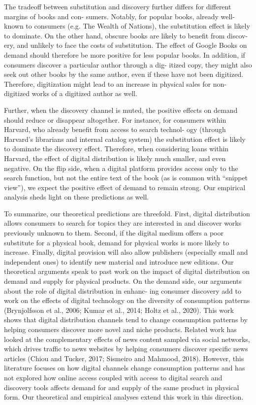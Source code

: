 \documentclass{article}
\begin{document}
The tradeoff between substitution and discovery further differs for different margins of books and con- sumers. Notably, for popular books, already well-known to consumers (e.g. The Wealth of Nations), the substitution effect is likely to dominate. On the other hand, obscure books are likely to benefit from discov- ery, and unlikely to face the costs of substitution. The effect of Google Books on demand should therefore be more positive for less popular books. In addition, if consumers discover a particular author through a dig- itized copy, they might also seek out other books by the same author, even if these have not been digitized. Therefore, digitization might lead to an increase in physical sales for non-digitized works of a digitized author as well.

Further, when the discovery channel is muted, the positive effects on demand should reduce or disappear altogether. For instance, for consumers within Harvard, who already benefit from access to search technol- ogy (through Harvard’s librarians and internal catalog system) the substitution effect is likely to dominate the discovery effect. Therefore, when considering loans within Harvard, the effect of digital distribution is likely much smaller, and even negative. On the flip side, when a digital platform provides access only to the search function, but not the entire text of the book (as is common with “snippet view”), we expect the positive effect of demand to remain strong. Our empirical analysis sheds light on these predictions as well.

To summarize, our theoretical predictions are threefold. First, digital distribution allows consumers to search for topics they are interested in and discover works previously unknown to them. Second, if the digital medium offers a poor substitute for a physical book, demand for physical works is more likely to increase. Finally, digital provision will also allow publishers (especially small and independent ones) to identify new material and introduce new editions.
Our theoretical arguments speak to past work on the impact of digital distribution on demand and supply for physical products. On the demand side, our arguments about the role of digital distribution in enhanc- ing consumer discovery add to work on the effects of digital technology on the diversity of consumption patterns (Brynjolfsson et al., 2006; Kumar et al., 2014; Holtz et al., 2020). This work shows that digital distribution channels tend to change consumption patterns by helping consumers discover more novel and niche products. Related work has looked at the complementary effects of news content sampled via social networks, which drives traffic to news websites by helping consumers discover specific news articles (Chiou and Tucker, 2017; Sismeiro and Mahmood, 2018). However, this literature focuses on how digital channels change consumption patterns and has not explored how online access coupled with access to digital search and discovery tools affects demand for and supply of the same product in physical form. Our theoretical and empirical analyses extend this work in this direction.
\end{document}

